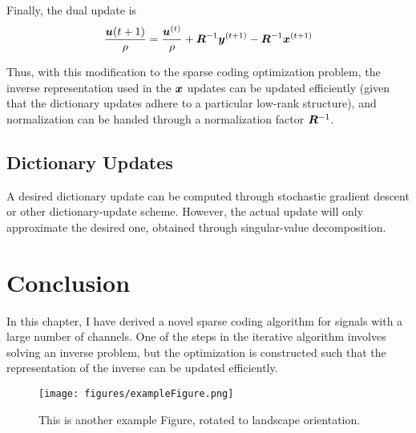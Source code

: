 Finally, the dual update is 
\begin{equation}
\frac{\bm{u}{(t + 1)}}{\rho} = \frac{\bm{u}^{(t)}}{\rho} + \bm{R}^{-1}\bm{y}^{(t + 1)} - \bm{R}^{-1}\bm{x}^{(t + 1)}
\end{equation}

Thus, with this modification to the sparse coding optimization problem, the inverse representation used in the $\bm{x}$ updates can be updated efficiently (given that the dictionary updates adhere to a particular low-rank structure), and normalization can be handed through a normalization factor $\bm{R}^{-1}$.

\subsection{Dictionary Updates}

A desired dictionary update can be computed through stochastic gradient descent or other dictionary-update scheme. However, the actual update will only approximate the desired one, obtained through singular-value decomposition.

\section{Conclusion}
In this chapter, I have derived a novel sparse coding algorithm for signals with a large number of channels. One of the steps in the iterative algorithm involves solving an inverse problem, but the optimization is constructed such that the representation of the inverse can be updated efficiently.
\begin{sidewaysfigure}
\texttt{[image: figures/exampleFigure.png]}
\caption{This is another example Figure, rotated to landscape orientation.}
\label{LandscapeFigure}
\end{sidewaysfigure}
